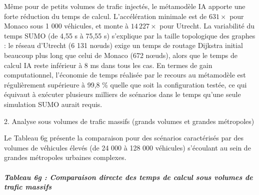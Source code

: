 \documentclass[10pt, a4paper]{article}
\begin{document}
Même pour de petits volumes de trafic injectés, le métamodèle IA apporte
une forte réduction du temps de calcul. L'accélération minimale est de
\(631\times\) pour Monaco sous 1 000 véhicules, et monte à
\(14\,227\times\) pour Utrecht. La variabilité du temps SUMO (de 4,55 s
à 75,55 s) s'explique par la taille topologique des graphes : le réseau
d'Utrecht (6 131 nœuds) exige un temps de routage Dijkstra initial
beaucoup plus long que celui de Monaco (672 nœuds), alors que le temps
de calcul IA reste inférieur à 8 ms dans tous les cas. En termes de gain
computationnel, l'économie de temps réalisée par le recours au
métamodèle est régulièrement supérieure à 99,8 \% quelle que soit la
configuration testée, ce qui équivaut à exécuter plusieurs milliers de
scénarios dans le temps qu'une seule simulation SUMO aurait requis.

2. Analyse sous volumes de trafic massifs (grands volumes et grandes
métropoles)

Le Tableau 6g présente la comparaison pour des scénarios caractérisés
par des volumes de véhicules élevés (de 24 000 à 128 000 véhicules)
s'écoulant au sein de grandes métropoles urbaines complexes.

\subparagraph{Tableau 6g : Comparaison directe des temps de calcul sous
volumes de trafic
massifs}\label{tableau-6g-comparaison-directe-des-temps-de-calcul-sous-volumes-de-trafic-massifs}
\end{document}

